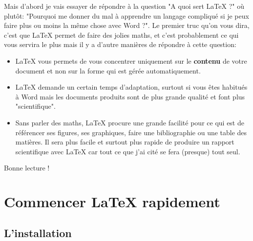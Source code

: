 \documentclass[11pt]{article}				%
\begin{document}
Mais d'abord je vais essayer de répondre à la question "A quoi sert {\LaTeX} ?" où plutôt: "Pourquoi me donner du mal à apprendre un langage compliqué si je peux faire plus ou moins la même chose avec Word ?". Le premier truc qu'on vous dira, c'est que LaTeX permet de faire des jolies maths, et c'est probablement ce qui vous servira le plus mais il y a d'autre manières de répondre à cette question:
\begin{itemize}
	\item LaTeX vous permets de vous concentrer uniquement sur le \textbf{contenu} de votre document et non sur la forme qui est gérée automatiquement.
	\item LaTeX demande un certain temps d'adaptation, surtout si vous êtes habitués à Word mais les documents produits sont de plus grande qualité et font plus "scientifique".
	\item Sans parler des maths, LaTeX procure une grande facilité pour ce qui est de référencer ses figures, ses graphiques, faire une bibliographie ou une table des matières. Il sera plus facile et surtout plus rapide de produire un rapport scientifique avec LaTeX car tout ce que j'ai cité se fera (presque) tout seul.
\end{itemize}  

Bonne lecture !
    
\clearpage


\section*{Commencer {\LaTeX} rapidement}

\subsection*{L'installation}
\end{document}
